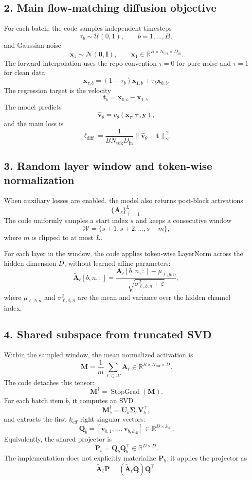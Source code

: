 \documentclass[11pt]{article}
\newcommand{\StopGrad}{\operatorname{StopGrad}}
\begin{document}
\subsection*{2. Main flow-matching diffusion objective}
For each batch, the code samples independent timesteps
\[
  \tau_b \sim \mathcal{U}(0,1),
  \qquad b=1,\dots,B,
\]
and Gaussian noise
\[
  \bm{x}_1 \sim \mathcal{N}(\bm{0}, \bm{I}),
  \qquad
  \bm{x}_1 \in \mathbb{R}^{B\times N_{\mathrm{tok}}\times D_{\mathrm{in}}}.
\]
The forward interpolation uses the repo convention $\tau=0$ for pure noise and $\tau=1$ for clean data:
\[
  \bm{x}_{\tau,b} = (1-\tau_b)\bm{x}_{1,b} + \tau_b \bm{x}_{0,b}.
\]
The regression target is the velocity
\[
  \bm{t}_b = \bm{x}_{0,b} - \bm{x}_{1,b}.
\]
The model predicts
\[
  \hat{\bm{v}}_\theta = v_\theta(\bm{x}_\tau,\bm{\tau},\bm{y}),
\]
and the main loss is
\[
  \ell_{\mathrm{diff}}
  =
  \frac{1}{B N_{\mathrm{tok}} D_{\mathrm{in}}}
  \left\|
    \hat{\bm{v}}_\theta - \bm{t}
  \right\|_2^2.
\]

\subsection*{3. Random layer window and token-wise normalization}
When auxiliary losses are enabled, the model also returns post-block activations
\[
  \{\bm{A}_\ell\}_{\ell=1}^{L}.
\]
The code uniformly samples a start index $s$ and keeps a consecutive window
\[
  \mathcal{W} = \{s+1, s+2, \dots, s+m\},
\]
where $m$ is clipped to at most $L$.

For each layer in the window, the code applies token-wise LayerNorm across the hidden dimension $D$, without learned affine parameters:
\[
  \tilde{\bm{A}}_\ell[b,n,:]
  =
  \frac{
    \bm{A}_\ell[b,n,:] - \mu_{\ell,b,n}
  }{
    \sqrt{\sigma_{\ell,b,n}^2 + \varepsilon}
  },
\]
where $\mu_{\ell,b,n}$ and $\sigma_{\ell,b,n}^2$ are the mean and variance over the hidden channel index.

\subsection*{4. Shared subspace from truncated SVD}
Within the sampled window, the mean normalized activation is
\[
  \bm{M}
  =
  \frac{1}{m}\sum_{\ell\in\mathcal{W}}\tilde{\bm{A}}_\ell
  \in \mathbb{R}^{B\times N_{\mathrm{tok}}\times D}.
\]
The code detaches this tensor:
\[
  \bm{M}^{\dagger} = \StopGrad(\bm{M}).
\]
For each batch item $b$, it computes an SVD
\[
  \bm{M}^{\dagger}_b = \bm{U}_b \bm{\Sigma}_b \bm{V}_b^\top,
\]
and extracts the first $k_{\mathrm{eff}}$ right singular vectors:
\[
  \bm{Q}_b
  =
  \left[\bm{v}_{b,1}, \dots, \bm{v}_{b,k_{\mathrm{eff}}}\right]
  \in \mathbb{R}^{D\times k_{\mathrm{eff}}}.
\]
Equivalently, the shared projector is
\[
  \bm{P}_b = \bm{Q}_b \bm{Q}_b^\top \in \mathbb{R}^{D\times D}.
\]
The implementation does not explicitly materialize $\bm{P}_b$; it applies the projector as
\[
  \tilde{\bm{A}}_\ell \bm{P}
  =
  (\tilde{\bm{A}}_\ell \bm{Q}) \bm{Q}^\top.
\]
\end{document}
